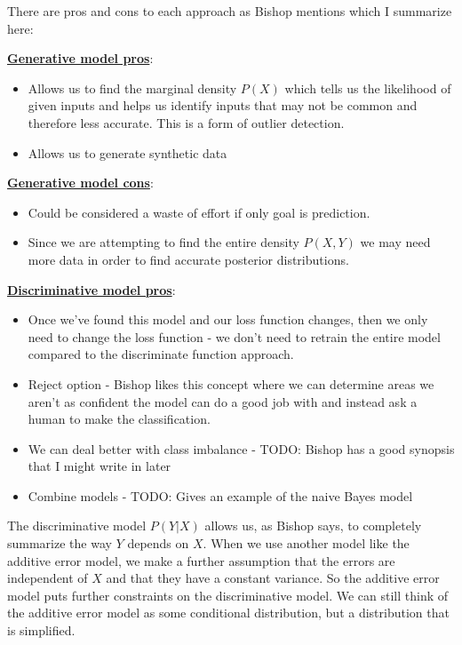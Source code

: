 There are pros and cons to each approach as Bishop mentions which I summarize here:
\break

\noindent \underline{\textbf{Generative model pros}}:
\begin{itemize}
\item Allows us to find the marginal density $P(X)$ which tells us the likelihood of given inputs and helps us identify inputs that may not be common and therefore less accurate. This is a form of outlier detection.
\item Allows us to generate synthetic data
\end{itemize}

\noindent \underline{\textbf{Generative model cons}}:
\begin{itemize}
\item Could be considered a waste of effort if only goal is prediction. 
\item Since we are attempting to find the entire density $P(X,Y)$ we may need more data in order to find accurate posterior distributions.
\end{itemize}

\noindent \underline{\textbf{Discriminative model pros}}:
\begin{itemize}
\item Once we've found this model and our loss function changes, then we only need to change the loss function - we don't need to retrain the entire model compared to the discriminate function approach.
\item Reject option - Bishop likes this concept where we can determine areas we aren't as confident the model can do a good job with and instead ask a human to make the classification.
\item We can deal better with class imbalance - TODO: Bishop has a good synopsis that I might write in later
\item Combine models - TODO: Gives an example of the naive Bayes model
\end{itemize}


The discriminative model $P(Y|X)$ allows us, as Bishop says,  to completely summarize the way $Y$ depends on $X$. When we use another model like the additive error model, we make a further assumption that the errors are independent of $X$ and that they have a constant variance. So the additive error model puts further constraints on the discriminative model. We can still think of the additive error model as some conditional distribution, but a distribution that is simplified.

